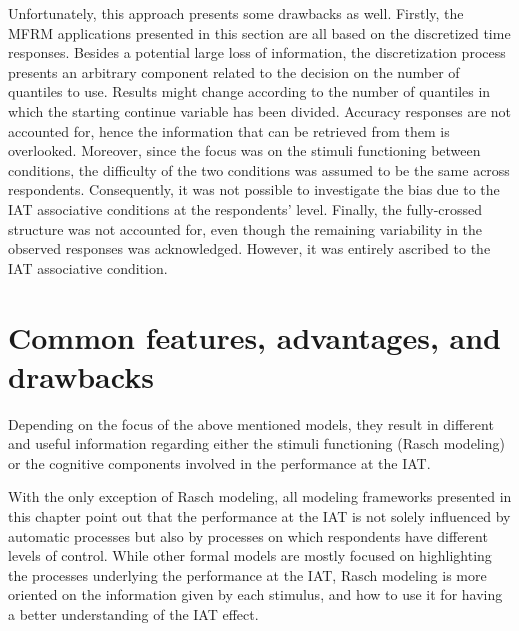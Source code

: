 \documentclass[12pt]{book}
\begin{document}
Unfortunately, this approach presents some drawbacks as well. 
Firstly, the MFRM applications presented in this section are all based on the discretized time responses. Besides a potential large loss of information, the discretization process presents an arbitrary component related to the decision on the number of quantiles to use.
Results might change according to the number of quantiles in which the starting continue variable has been divided.
Accuracy responses are not accounted for, hence the information that can be retrieved from them is overlooked.
Moreover, since the focus was on the stimuli functioning between conditions, the difficulty of the two conditions was assumed to be the same across respondents. Consequently, it was not possible to investigate the bias due to the IAT associative conditions at the respondents' level.
Finally, the fully-crossed structure was not accounted for, even though the remaining variability in the observed responses was acknowledged. However, it was entirely ascribed to the IAT associative condition. 

\section{Common features, advantages, and drawbacks} 

Depending on the focus of the above mentioned models, they result in different and useful information regarding either the stimuli functioning (Rasch modeling) or the cognitive components involved in the performance at the IAT. 

With the only exception of Rasch modeling, all modeling frameworks presented in this chapter point out that the performance at the IAT is not solely influenced by automatic processes but also by processes on which respondents have different levels of control. 
While other formal models are mostly focused on highlighting the processes underlying the performance at the IAT, Rasch modeling is more oriented on the information given by each stimulus, and how to use it for having a better understanding of the IAT effect. 
\end{document}
